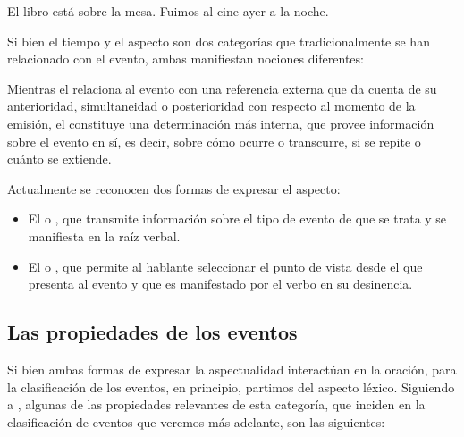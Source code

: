 \begin{exe}
  \ex\label{ex:08-libro} El libro está sobre la mesa.
  \ex\label{ex:08-cine} Fuimos al cine ayer a la noche.
\end{exe}

Si bien el tiempo y el aspecto son dos categorías que tradicionalmente se han
relacionado con el evento, ambas manifiestan nociones diferentes:

\begin{destacado}
Mientras el  relaciona al evento con una referencia externa que
da cuenta de su anterioridad, simultaneidad o posterioridad con respecto al
momento de la emisión, el  constituye una determinación más
interna, que provee información sobre el evento en sí, es decir, sobre cómo
ocurre o transcurre, si se repite o cuánto se extiende.
\end{destacado}

Actualmente se reconocen dos formas de expresar el aspecto:

\begin{itemize}
  \item El  o , que transmite
        información sobre el tipo de evento de que se trata y se manifiesta en
        la raíz verbal.
  \item El  o , que permite al
        hablante seleccionar el punto de vista desde el que presenta al evento y
        que es manifestado por el verbo en su desinencia.
\end{itemize}

\subsection{Las propiedades de los eventos}\label{sec:08-propiedades}

Si bien ambas formas de expresar la aspectualidad interactúan en la oración,
para la clasificación de los eventos, en principio, partimos del aspecto léxico.
Siguiendo a \textcite{pustejovsky2019}, algunas de las propiedades relevantes de
esta categoría, que inciden en la clasificación de eventos que veremos más
adelante, son las siguientes:

